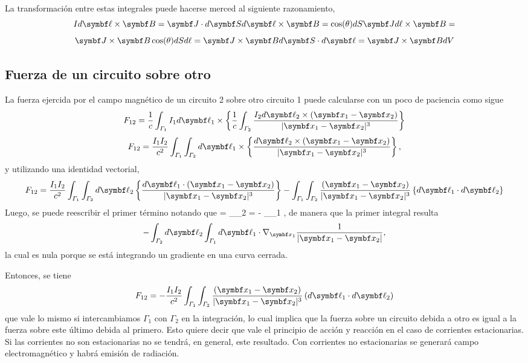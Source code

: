 \documentclass[10pt,oneside]{CBFT_book}
\begin{document}
La transformación entre estas integrales puede hacerse merced al siguiente razonamiento,
\[
  	I d\vb{\ell} \times \vb{B} = \vb{J}  \cdot d\vb{S} d\vb{\ell}  \times \vb{B} =
  	\cos(\theta) dS \vb{J} d\ell \times \vb{B} = 
\]
\[
	\vb{J} \times \vb{B}  \cos(\theta) dS d\ell  = \vb{J} \times \vb{B}  d\vb{S} \cdot d\vb{\ell}  = 
	\vb{J} \times \vb{B}  dV 
\]

\subsection{Fuerza de un circuito sobre otro}

La fuerza ejercida por el campo magnético de un circuito 2 sobre otro circuito 1 puede calcularse con un poco de 
paciencia como sigue
\[
	F_{12} = \frac{1}{c} \int_{\Gamma_1} I_1 d\vb{\ell}_1 \times \left\{
	\frac{1}{c} \int_{\Gamma_2} \frac{I_2 d\vb{\ell}_2 \times (\vb{x}_1 - \vb{x}_2)}{|\vb{x}_1 - \vb{x}_2|^3} 
	\right\}
\]
\[
	F_{12} = \frac{I_1 I_2}{c^2} \int_{\Gamma_1} \int_{\Gamma_2} d\vb{\ell}_1 \times \left\{
	\frac{d\vb{\ell}_2 \times (\vb{x}_1 - \vb{x}_2)}{|\vb{x}_1 - \vb{x}_2|^3} 
	\right\},
\]
y utilizando una identidad vectorial, 
\[
	F_{12} = \frac{I_1 I_2}{c^2} \int_{\Gamma_1} \int_{\Gamma_2} d\vb{\ell}_2  \left\{
	\frac{d\vb{\ell}_1 \cdot (\vb{x}_1 - \vb{x}_2)}{|\vb{x}_1 - \vb{x}_2|^3} 
	\right\} - \int_{\Gamma_1} \int_{\Gamma_2} \frac{ (\vb{x}_1 - \vb{x}_2)}{|\vb{x}_1 - \vb{x}_2|^3} 
	\left\{ d\vb{\ell}_1 \cdot d\vb{\ell}_2 \right\}
\]
Luego, se puede reescribir el primer término notando que 
\be
	 = 
	\nabla_{_2}  =
	- \nabla_{_1}  ,
	\label{ident_vec_posicion}
\ee
de manera que la primer integral resulta 
\[
	- \int_{\Gamma_2} d\vb{\ell}_2 \int_{\Gamma_1} d\vb{\ell}_1 \cdot \nabla_{\vb{x}_1} \frac{ 1 }{|\vb{x}_1 - \vb{x}_2|} ,
\]
la cual es nula porque se está integrando un gradiente en una curva cerrada.

Entonces, se tiene 
\[
	F_{12} = - \frac{I_1 I_2}{c^2} \int_{\Gamma_1} \int_{\Gamma_2} \frac{ (\vb{x}_1 - \vb{x}_2)}{|\vb{x}_1 - \vb{x}_2|^3} 
	\left( d\vb{\ell}_1 \cdot d\vb{\ell}_2 \right)
\]
que vale lo mismo si intercambiamos $\Gamma_1$ con $\Gamma_2$ en la integración, lo cual implica
que la fuerza sobre un circuito debida a otro es igual a la fuerza sobre este último debida al primero.
Esto quiere decir que vale el principio de acción y reacción en el caso de corrientes estacionarias.
Si las corrientes no son estacionarias no se tendrá, en general, este resultado. Con corrientes no
estacionarias se generará campo electromagnético y habrá emisión de radiación.
\end{document}

